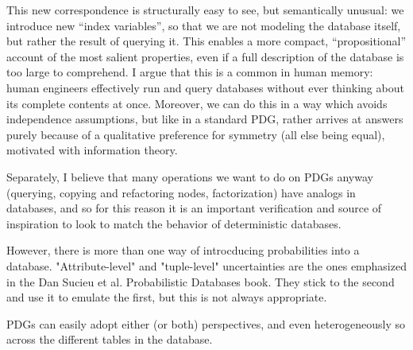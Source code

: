 \documentclass{article}
\theoremstyle{plain}
\theoremstyle{definition}
\theoremstyle{remark}
\begin{document}
This new correspondence is structurally easy to see, but semantically unusual: we introduce new ``index variables'', so that we are not modeling the database itself, but rather the result of querying it. This enables a more compact, ``propositional'' account of the most salient properties, even if a full description of the database is too large to comprehend. I argue that this is a common in human memory: human engineers effectively run and query databases without ever thinking about its complete contents at once. Moreover, we can do this in a way which avoids independence assumptions, but like in a standard PDG, rather arrives at answers purely because of a qualitative preference for symmetry (all else being equal), motivated with information theory.

Separately, I believe that many operations we want to do on PDGs anyway (querying, copying and refactoring nodes, factorization) have analogs in databases, and so for this reason it is an important verification and source of inspiration to look to match the behavior of deterministic databases.

However, there is more than one way of introcducing probabilities into a database. "Attribute-level" and "tuple-level" uncertainties are the ones emphasized in the Dan Sucieu et al. Probabilistic Databases book. They stick to the second and use it to emulate the first, but this is not always appropriate.


PDGs can easily adopt either (or both) perspectives, and even heterogeneously so across the different tables in the database. 
\end{document}

